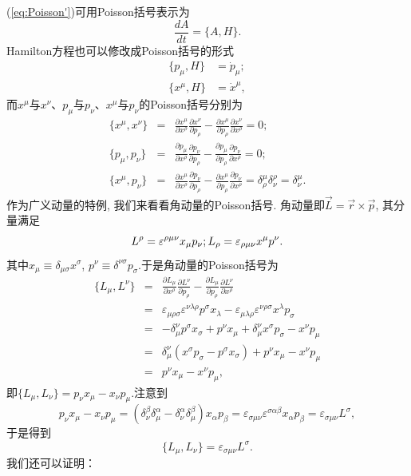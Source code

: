 		(\ref{eq:Poisson'})可用Poisson括号表示为
		\begin{equation}\label{eq:heq1}
		\frac{dA}{dt}=\{A,H\}.
		\end{equation}
		Hamilton方程也可以修改成Poisson括号的形式
		\begin{equation}
		\begin{split}
			\{p_\mu,H\}&={\dot{p}_\mu};\\
			\{x^\mu,H\}&={\dot{x}}^\mu,
		\end{split}
		\end{equation}
		而$x^\mu$与$x^\nu$、$p_\mu$与$p_\nu$、$x^\mu$与$p_\nu$的Poisson括号分别为
		\begin{eqnarray}\label{eq:xxppxp}
			\{x^\mu,x^\nu\}&=&\frac{\partial x^\mu}{\partial x^\rho}\frac{\partial x^\nu}{\partial p_\rho}-\frac{\partial x^\mu}{\partial p_\rho}\frac{\partial x^\nu}{\partial x^\rho}=0;\\
			\{p_\mu,p_\nu\}&=&\frac{\partial p_\mu}{\partial x^\rho}\frac{\partial p_\nu}{\partial p_\rho}-\frac{\partial p_\mu}{\partial p_\rho}\frac{\partial p_\nu}{\partial x^\rho}=0;\\
			\{x^\mu,p_\nu\}&=&\frac{\partial x^\mu}{\partial x^\rho}\frac{\partial p_\nu}{\partial p_\rho}-\frac{\partial x^\mu}{\partial p_\rho}\frac{\partial p_\nu}{\partial x^\rho}=\delta^\mu_\rho\delta^\rho_\nu=\delta^\mu_\nu.
		\end{eqnarray}
		作为广义动量的特例, 我们来看看角动量的Poisson括号.
		角动量即$\overrightarrow{L}=\overrightarrow{r}\times\overrightarrow{p}$, 其分量满足
		\begin{equation*}
			L^\rho=\varepsilon^{\rho\mu\nu}x_\mu p_\nu;\\
			L_\rho=\varepsilon_{\rho\mu\nu}x^\mu p^\nu.
		\end{equation*}
		其中$x_\mu\equiv\delta_{\mu\sigma}x^\sigma$, $p^\nu\equiv\delta^{\nu\sigma}p_\sigma$.于是角动量的Poisson括号为
		\begin{eqnarray*}
			\{L_\mu,L^\nu\}&=&\frac{\partial L_\mu}{\partial x^\rho}\frac{\partial L^\nu}{\partial p_\rho}-\frac{\partial L_\mu}{\partial p_\rho}\frac{\partial L^\nu}{\partial x^\rho}\\
			&=&\varepsilon_{\mu\rho\sigma}\varepsilon^{\nu\lambda\rho}p^\sigma x_\lambda-\varepsilon_{\mu\lambda\rho}\varepsilon^{\nu\rho\sigma}x^\lambda p_\sigma\\
			&=&-\delta^\nu_\mu p^\sigma x_\sigma+p^\nu x_\mu+\delta^\nu_\mu x^\sigma p_\sigma-x^\nu p_\mu\\
			&=&\delta^\nu_\mu\left(x^\sigma p_\sigma-p^\sigma x_\sigma\right)+p^\nu x_\mu-x^\nu p_\mu\\
			&=&p^\nu x_\mu-x^\nu p_\mu,
		\end{eqnarray*}
		即$\{L_\mu,L_\nu\}=p_\nu x_\mu-x_\nu p_\mu$.注意到
		$$p_\nu x_\mu-x_\nu p_\mu=\left(\delta^\beta_\nu\delta^\alpha_\mu-\delta^\alpha_\nu\delta^\beta_\mu\right)x_\alpha p_\beta=\varepsilon_{\sigma\mu\nu}\varepsilon^{\sigma\alpha\beta} x_\alpha p_\beta=\varepsilon_{\sigma\mu\nu}L^\sigma,$$
		于是得到
		\begin{equation}\label{eq:[L,L]}
			\{L_\mu,L_\nu\}=\varepsilon_{\sigma\mu\nu}L^\sigma.
		\end{equation}
		我们还可以证明：

